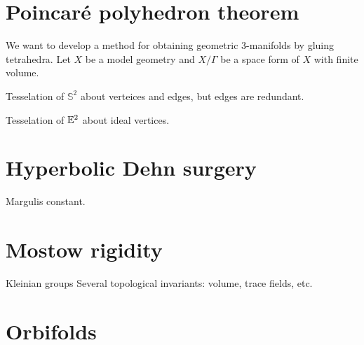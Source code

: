 \documentclass{../../large}
\begin{document}
\section{Poincar\'e polyhedron theorem}

\begin{prb}
\end{prb}

\begin{prb}
We want to develop a method for obtaining geometric 3-manifolds by gluing tetrahedra.
Let $X$ be a model geometry and $X/\Gamma$ be a space form of $X$ with finite volume.
\end{prb}

\begin{prb}
Tesselation of $\mathbb{S}^2$ about verteices and edges, but edges are redundant.
\end{prb}

\begin{prb}
Tesselation of $\mathbb{E}^2$ about ideal vertices.

\end{prb}



\section{Hyperbolic Dehn surgery}



\begin{prb}
\end{prb}

\begin{prb}
Margulis constant.
\end{prb}

\begin{prb}
\end{prb}


\section{Mostow rigidity}
Kleinian groups
Several topological invariants: volume, trace fields, etc.


\section{Orbifolds}
\end{document}
